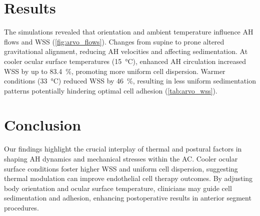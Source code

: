 \documentclass[a4paper]{article}
\begin{document}
\section*{Results}

The simulations revealed that orientation and ambient temperature influence AH flows and WSS (\cref{fig:arvo_flows}).
Changes from supine to prone altered gravitational alignment, reducing AH velocities and affecting sedimentation.
At cooler ocular surface temperatures (\qty{15}{\degreeCelsius}), enhanced AH circulation increased WSS by up to \qty{83.4}{\percent}, promoting more uniform cell dispersion.
Warmer conditions (\qty{33}{\degreeCelsius}) reduced WSS by \qty{46}{\percent}, resulting in less uniform sedimentation patterns potentially hindering optimal cell adhesion (\cref{tab:arvo_wss}).






\section*{Conclusion}

Our findings highlight the crucial interplay of thermal and postural factors in shaping AH dynamics and mechanical stresses within the AC.
Cooler ocular surface conditions foster higher WSS and uniform cell dispersion, suggesting thermal modulation can improve endothelial cell therapy outcomes.
By adjusting body orientation and ocular surface temperature, clinicians may guide cell sedimentation and adhesion, enhancing postoperative results in anterior segment procedures.
\end{document}
